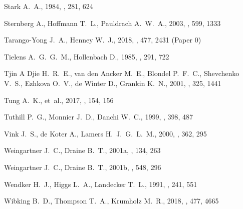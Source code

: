 \documentclass[useAMS, usenatbib, a4paper]{mnras}
\begin{document}
\begin{thebibliography}{}
{Stark} A.~A.,  1984, \apj, 281, 624

{Sternberg} A.,  {Hoffmann} T.~L.,   {Pauldrach} A.~W.~A.,  2003, \apj, 599,
  1333

{Tarango-Yong} J.~A.,  {Henney} W.~J.,  2018, \mnras, 477, 2431 (Paper 0)

{Tielens} A.~G.~G.~M.,  {Hollenbach} D.,  1985, \apj, 291, 722

{Tjin A Djie} H.~R.~E.,  {van den Ancker} M.~E.,  {Blondel} P.~F.~C.,
  {Shevchenko} V.~S.,  {Ezhkova} O.~V.,  {de Winter} D.,   {Grankin} K.~N.,
  2001, \mnras, 325, 1441

{Tung} A.~K.,  et~al., 2017, \aj, 154, 156

{Tuthill} P.~G.,  {Monnier} J.~D.,   {Danchi} W.~C.,  1999, \nat, 398, 487

{Vink} J.~S.,  {de Koter} A.,   {Lamers} H.~J.~G.~L.~M.,  2000, \aap, 362, 295

{Weingartner} J.~C.,  {Draine} B.~T.,  2001a, \apjs, 134, 263

{Weingartner} J.~C.,  {Draine} B.~T.,  2001b, \apj, 548, 296

{Wendker} H.~J.,  {Higgs} L.~A.,   {Landecker} T.~L.,  1991, \aap, 241, 551

{Wibking} B.~D.,  {Thompson} T.~A.,   {Krumholz} M.~R.,  2018, \mnras, 477,
  4665


\end{thebibliography}
\end{document}
